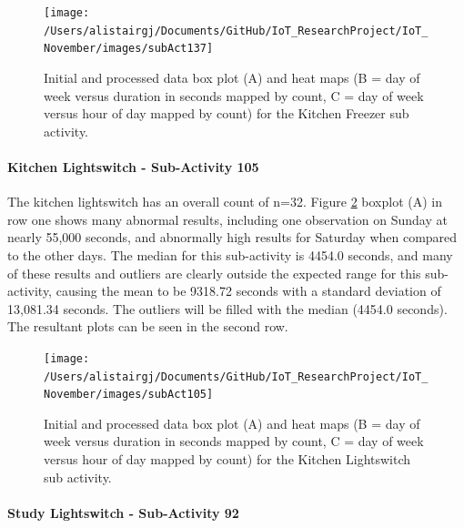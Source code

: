 \documentclass[11pt,]{article}
\let\oldparagraph\paragraph
\renewcommand{\paragraph}[1]{\oldparagraph{#1}\mbox{}}
\begin{document}
\begin{figure}[H]

{\centering \texttt{[image: /Users/alistairgj/Documents/GitHub/IoT\_ResearchProject/IoT\_November/images/subAct137]} 

}

\caption{Initial and processed data box plot (A) and heat maps (B = day of week versus duration in seconds mapped by count, C = day of week versus hour of day mapped by count) for the Kitchen Freezer sub activity.}\label{fig:subAct137}
\end{figure}

\hypertarget{kitchen-lightswitch---sub-activity-105}{%
\paragraph{Kitchen Lightswitch - Sub-Activity
105}\label{kitchen-lightswitch---sub-activity-105}}

The kitchen lightswitch has an overall count of n=32. Figure
\ref{fig:subAct105} boxplot (A) in row one shows many abnormal results,
including one observation on Sunday at nearly 55,000 seconds, and
abnormally high results for Saturday when compared to the other days.
The median for this sub-activity is 4454.0 seconds, and many of these
results and outliers are clearly outside the expected range for this
sub-activity, causing the mean to be 9318.72 seconds with a standard
deviation of 13,081.34 seconds. The outliers will be filled with the
median (4454.0 seconds). The resultant plots can be seen in the second
row.

\begin{figure}[H]

{\centering \texttt{[image: /Users/alistairgj/Documents/GitHub/IoT\_ResearchProject/IoT\_November/images/subAct105]} 

}

\caption{Initial and processed data box plot (A) and heat maps (B = day of week versus duration in seconds mapped by count, C = day of week versus hour of day mapped by count) for the Kitchen Lightswitch sub activity.}\label{fig:subAct105}
\end{figure}

\hypertarget{study-lightswitch---sub-activity-92}{%
\paragraph{Study Lightswitch - Sub-Activity
92}\label{study-lightswitch---sub-activity-92}}
\end{document}
